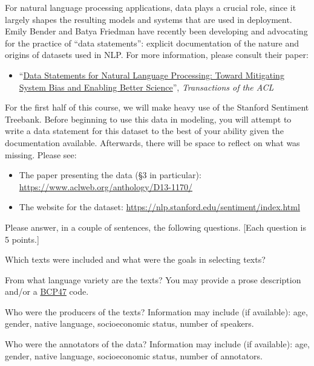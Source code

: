 \documentclass[11pt]{article}
\begin{document}
For natural language processing applications, data plays a crucial role, since it largely shapes the resulting models and systems that are used in deployment.  Emily Bender and Batya Friedman have recently been developing and advocating for the practice of ``data statements'': explicit documentation of the nature and origins of datasets used in NLP.  For more information, please consult their paper: 
\begin{itemize}
  \item ``\href{https://www.aclweb.org/anthology/Q18-1041/}{Data Statements for Natural Language Processing: Toward Mitigating System Bias and Enabling Better Science}'', \emph{Transactions of the ACL}
\end{itemize}
For the first half of this course, we will make heavy use of the Stanford Sentiment Treebank.  Before beginning to use this data in modeling, you will attempt to write a data statement for this dataset to the best of your ability given the documentation available.  Afterwards, there will be space to reflect on what was missing. Please see:
\begin{itemize}
  \item The paper presenting the data (\S3 in particular): \url{https://www.aclweb.org/anthology/D13-1170/}
  \item The website for the dataset: \url{https://nlp.stanford.edu/sentiment/index.html}
\end{itemize}
Please answer, in a couple of sentences, the following questions. [Each question is 5 points.]

\vspace{2em}
 Which texts were included  and  what  were  the  goals  in  selecting texts?

\vspace{2em}
 From what language variety are the texts?  You may provide a prose description and/or a \href{https://tools.ietf.org/rfc/bcp/bcp47.txt}{BCP47} code.

\vspace{2em}
 Who were the producers of the texts?  Information may include (if available): age, gender, native language, socioeconomic status, number of speakers.

\vspace{2em}
 Who were the annotators of the data?  Information may include (if available): age, gender, native language, socioeconomic status, number of annotators.
\end{document}
